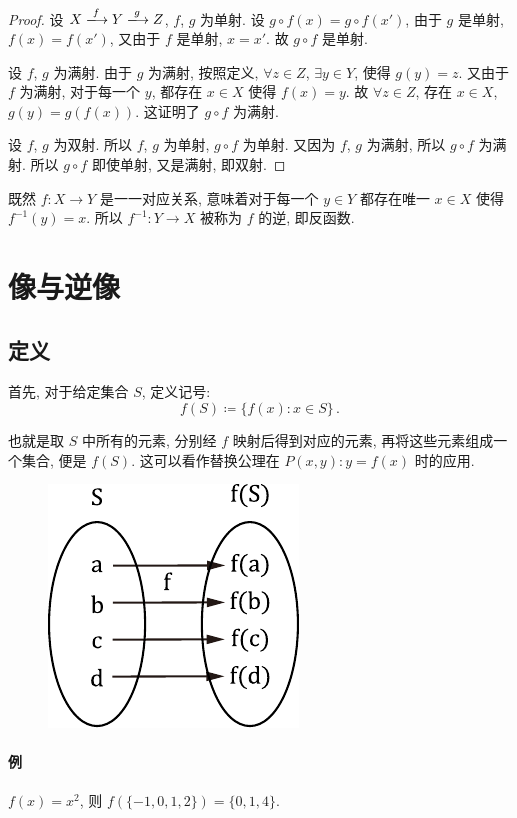 \documentclass[UTF8]{ctexart}
\theoremstyle{mystyle}
\theoremstyle{myremark}
\theoremstyle{plain}
\newcommand{\set}[1]{\{#1\}}
\begin{document}
\begin{proof}
    设 $ X \xlongrightarrow{f} Y \xlongrightarrow{g} Z $, $ f $, $ g $ 为单射. 设 $ g \circ f (x) = g \circ f (x') $, 由于 $ g $ 是单射, $ f(x) = f(x') $, 又由于 $ f $ 是单射, $ x = x' $. 故 $ g \circ f $ 是单射.

    设 $ f $, $ g $ 为满射. 由于 $ g $ 为满射, 按照定义, $ \forall z \in Z $, $ \exists y \in Y $, 使得 $ g (y) = z $. 又由于 $ f $ 为满射, 对于每一个 $ y $, 都存在 $ x \in X $ 使得 $ f(x) = y $. 故 $ \forall z \in Z $, 存在 $ x \in X $, $ g(y) = g(f(x)) $. 这证明了 $ g \circ f $ 为满射.

    设 $ f $, $ g $ 为双射. 所以 $ f $, $ g $ 为单射, $ g \circ f $ 为单射. 又因为 $ f $, $ g $ 为满射, 所以 $ g \circ f $ 为满射. 所以 $ g \circ f $ 即使单射, 又是满射, 即双射.
\end{proof}

既然 $ f \colon X \to Y $ 是一一对应关系, 意味着对于每一个 $ y \in Y $ 都存在唯一 $ x \in X $ 使得 $ f^{-1}(y) = x $. 所以 $ f^{-1} \colon Y \to X $ 被称为 $ f $ 的逆, 即反函数.

\section{像与逆像}
\subsection{定义}
首先, 对于给定集合 $ S $, 定义记号:
\[ f(S) \coloneqq \set{f(x) \colon x \in S}  \,.\]

也就是取 $ S $ 中所有的元素, 分别经 $ f $ 映射后得到对应的元素, 再将这些元素组成一个集合, 便是 $ f(S) $. 这可以看作替换公理在 $ P(x, y) \colon  y = f(x) $ 时的应用.

\begin{figure}[H]
    \centering
    \includegraphics[width = 0.3\linewidth]{./images/image.pdf}
\end{figure}


\paragraph{例}
$ f(x) = x^2 $, 则 $ f(\set{-1, 0, 1, 2}) = \set{0, 1, 4} $.
\end{document}
